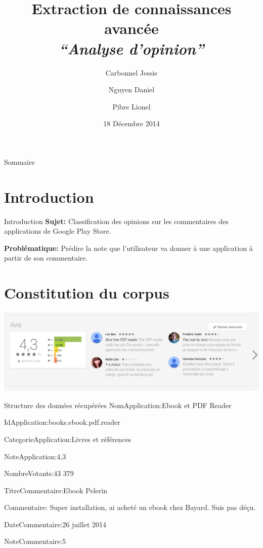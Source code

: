 \documentclass{beamer}
\title[Classification de documents]{Extraction de connaissances avancée\\ \emph{``Analyse d'opinion''}}
\author{Carbonnel Jessie \and Nguyen Daniel \and Pibre Lionel}
\institute[UM2]{Université de Montpellier 2}
\date{18 Décembre 2014}
\begin{document}
\begin{frame}
\titlepage
\end{frame}

\begin{frame}{Sommaire}
	\tableofcontents[hidesubsections]
\end{frame}
\section{Introduction}
\begin{frame}
	\begin{block}{Introduction}
		\textbf{Sujet:} Classification des opinions sur les commentaires des applications de Google Play Store.		
		
		\vspace{0.5cm}
		
		\textbf{Problématique:} Prédire la note que l'utilisateur va donner à une application à partir de son commentaire.
			
	\end{block}
\end{frame}

\section{Constitution du corpus}
\begin{frame}
	\includegraphics[width=\textwidth]{imgs/ebook.png}
\end{frame}


\begin{frame}
	\begin{block}{Structure des données récupérées}
			NomApplication:Ebook et PDF Reader

			IdApplication:books.ebook.pdf.reader

			CategorieApplication:Livres et références

			NoteApplication:4,3

			NombreVotants:43 379

			TitreCommentaire:Ebook Pelerin

			Commentaire: Super installation, ai acheté un ebook chez Bayard. Suis pas déçu.

			DateCommentaire:26 juillet 2014

			NoteCommentaire:5
	\end{block}
\end{frame}
\end{document}
